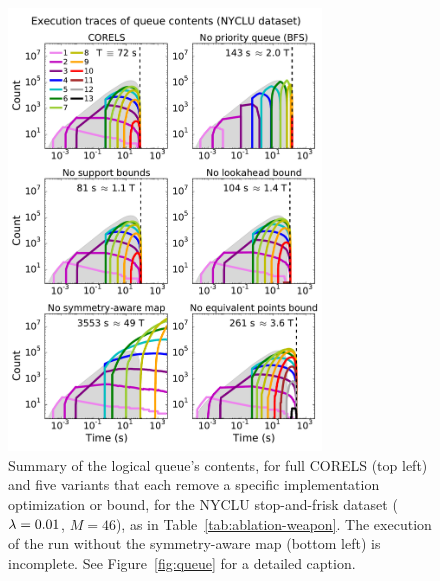 \begin{figure}[t!]
\begin{center}
\includegraphics[trim={0mm 0mm 0mm 5mm}, width=0.74\textwidth]{figs/weapon_ablation-queue.pdf}
\end{center}
\vspace{-5mm}
\caption{Summary of the logical queue's contents, for full CORELS (top left)
and five variants that each remove a specific implementation optimization or bound,
for the NYCLU stop-and-frisk dataset (${{\lambda} = 0.01}$, ${M = 46}$), as in Table~\ref{tab:ablation-weapon}.
The execution of the run without the symmetry-aware map (bottom left) is incomplete.
%
See Figure~\ref{fig:queue} for a detailed caption.
}
\label{fig:queue-weapon}
\end{figure}

